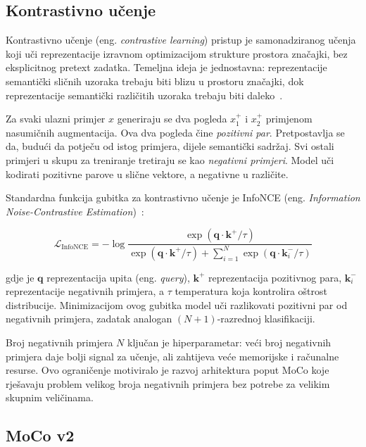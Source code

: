 \documentclass[diplomskirad]{fer}
\begin{document}
\subsection{Kontrastivno učenje}

Kontrastivno učenje (eng. \textit{contrastive learning}) pristup je samonadziranog učenja koji uči reprezentacije izravnom optimizacijom strukture prostora značajki, bez eksplicitnog pretext zadatka. Temeljna ideja je jednostavna: reprezentacije semantički sličnih uzoraka trebaju biti blizu u prostoru značajki, dok reprezentacije semantički različitih uzoraka trebaju biti daleko~\cite{chen2020simclr, he2020moco}.

Za svaki ulazni primjer $x$ generiraju se dva pogleda $x^+_1$ i $x^+_2$ primjenom nasumičnih augmentacija. Ova dva pogleda čine \textit{pozitivni par}. Pretpostavlja se da, budući da potječu od istog primjera, dijele semantički sadržaj. Svi ostali primjeri u skupu za treniranje tretiraju se kao \textit{negativni primjeri}. Model uči kodirati pozitivne parove u slične vektore, a negativne u različite.

Standardna funkcija gubitka za kontrastivno učenje je InfoNCE (eng. \textit{Information Noise-Contrastive Estimation})~\cite{he2020moco}:

\begin{equation}
	\mathcal{L}_{\text{InfoNCE}} = -\log \frac{\exp(\mathbf{q} \cdot \mathbf{k}^+ / \tau)}{\exp(\mathbf{q} \cdot \mathbf{k}^+ / \tau) + \sum_{i=1}^{N} \exp(\mathbf{q} \cdot \mathbf{k}^-_i / \tau)}
\end{equation}

gdje je $\mathbf{q}$ reprezentacija upita (eng. \textit{query}), $\mathbf{k}^+$ reprezentacija pozitivnog para, $\mathbf{k}^-_i$ reprezentacije negativnih primjera, a $\tau$ temperatura koja kontrolira oštrost distribucije. Minimizacijom ovog gubitka model uči razlikovati pozitivni par od negativnih primjera, zadatak analogan $(N+1)$-razrednoj klasifikaciji.

Broj negativnih primjera $N$ ključan je hiperparametar: veći broj negativnih primjera daje bolji signal za učenje, ali zahtijeva veće memorijske i računalne resurse. Ovo ograničenje motiviralo je razvoj arhitektura poput MoCo koje rješavaju problem velikog broja negativnih primjera bez potrebe za velikim skupnim veličinama.

\subsection{MoCo v2}
\label{sec:mocov2}
\end{document}
